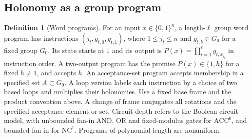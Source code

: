 \documentclass[11pt,reqno]{amsart}
\theoremstyle{definition}
\newtheorem{definition}[theorem]{Definition}
\theoremstyle{remark}
\numberwithin{equation}{section}
\begin{document}
\subsection{Holonomy as a group program}

\begin{definition}[Word programs]\label{m6:word-model}
For an input \(x\in\{0,1\}^n\), a length-\(\ell\) group word
program has instructions \((j_t,g_{t,0},g_{t,1})\), where
\(1\le j_t\le n\) and \(g_{t,b}\in G_0\) for a fixed group \(G_0\).
Its state starts at \(1\) and its output is
\(P(x)=\prod_{t=1}^{\ell}g_{t,x_{j_t}}\) in instruction order.
A two-output program has the promise \(P(x)\in\{1,h\}\)
for a fixed \(h\ne1\), and accepts \(h\). An acceptance-set
program accepts membership in a specified set \(A\subset G_0\).
A loop version labels each instruction by a choice of two
based loops and multiplies their holonomies. Use a fixed
base frame and the product convention above. A change of
frame conjugates all rotations and the specified acceptance
element or set. Circuit depth refers to the Boolean circuit
model, with unbounded fan-in AND, OR and fixed-modulus gates
for \(\mathrm{ACC}^0\), and bounded fan-in for \(\mathrm{NC}^1\).
Programs of polynomial length are nonuniform.
\end{definition}
\end{document}
